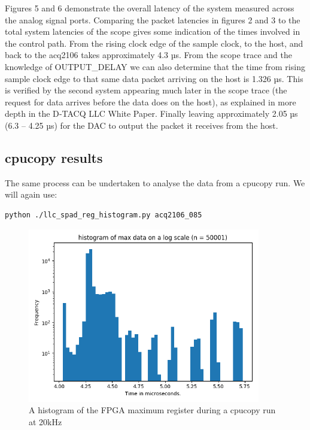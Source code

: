 \documentclass{article}
\begin{document}
Figures 5 and 6 demonstrate the overall latency of the system measured across the analog signal ports.
Comparing the packet latencies in figures 2 and 3 to the total system latencies of the scope gives some indication of the times involved in the control path.
From the rising clock edge of the sample clock, to the host, and back to the acq2106 takes approximately 4.3 µs.
From the scope trace and the knowledge of OUTPUT\_DELAY we can also determine that the time from rising sample clock edge to that same data packet arriving on the host is 1.326 µs.
This is verified by the second system appearing much later in the scope trace (the request for data arrives before the data does on the host), as explained in more depth in the D‑TACQ  LLC White Paper.
Finally leaving approximately 2.05 µs (6.3 – 4.25 µs)  for the DAC to output the packet it receives from the host.

\subsection{cpucopy results}
The same process can be undertaken to analyse the data from a cpucopy run. We will again use:

\begin{verbatim}
python ./llc_spad_reg_histogram.py acq2106_085
\end{verbatim}

\begin{figure}
	\centering
	\includegraphics[width=4.0in]{images/cpu_copy_20kHz.png}
	\caption{A histogram of the FPGA maximum register during a cpucopy run at 20kHz}
	\label{}
\end{figure}
\end{document}
